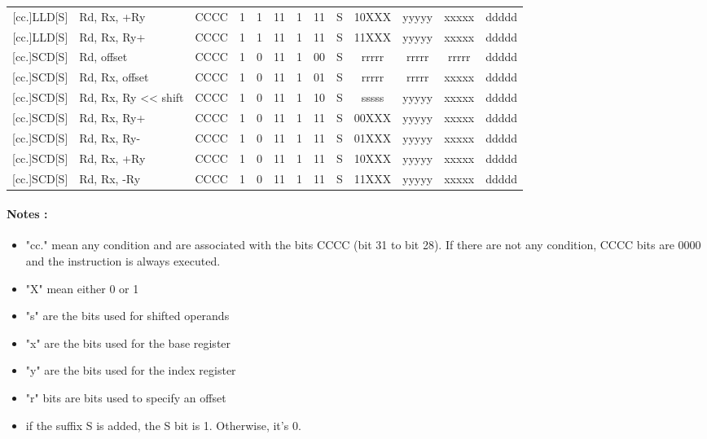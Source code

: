 \documentclass{article}
\begin{document}
\begin{longtable}{|r|l|c|c|c|c|c|c|c|ccc|c|}
        {[}cc.]LLD[S] & Rd, Rx, +Ry & CCCC & 1 & 1 & 11 & 1 & 11 & S & 10XXX & yyyyy & xxxxx & ddddd \\
        {[}cc.]LLD[S] & Rd, Rx, Ry+ & CCCC & 1 & 1 & 11 & 1 & 11 & S & 11XXX & yyyyy & xxxxx & ddddd \\
        \hline %
        {[}cc.]SCD[S] & Rd, offset & CCCC & 1 & 0 & 11 & 1 & 00 & S & rrrrr & rrrrr & rrrrr & ddddd \\
        {[}cc.]SCD[S] & Rd, Rx, offset & CCCC & 1 & 0 & 11 & 1 & 01 & S & rrrrr & rrrrr & xxxxx & ddddd \\
        {[}cc.]SCD[S] & Rd, Rx, Ry << shift & CCCC & 1 & 0 & 11 & 1 & 10 & S & sssss & yyyyy & xxxxx & ddddd \\
        {[}cc.]SCD[S] & Rd, Rx, Ry+ & CCCC & 1 & 0 & 11 & 1 & 11 & S & 00XXX & yyyyy & xxxxx & ddddd \\
        {[}cc.]SCD[S] & Rd, Rx, Ry- & CCCC & 1 & 0 & 11 & 1 & 11 & S & 01XXX & yyyyy & xxxxx & ddddd \\
        {[}cc.]SCD[S] & Rd, Rx, +Ry & CCCC & 1 & 0 & 11 & 1 & 11 & S & 10XXX & yyyyy & xxxxx & ddddd \\
        {[}cc.]SCD[S] & Rd, Rx, -Ry & CCCC & 1 & 0 & 11 & 1 & 11 & S & 11XXX & yyyyy & xxxxx & ddddd \\

\end{longtable}

\paragraph{Notes : }
\begin{itemize}
    \item "cc." mean any condition and are associated with the bits CCCC (bit 31 to bit 28). 
        If there are not any condition, CCCC bits are 0000 and the instruction is always executed.
    \item "X" mean either 0 or 1
    \item "s" are the bits used for shifted operands
    \item "x" are the bits used for the base register
    \item "y" are the bits used for the index register
    \item "r" bits are bits used to specify an offset
    \item if the suffix S is added, the S bit is 1. Otherwise, it's 0.
\end{itemize}
\end{document}
